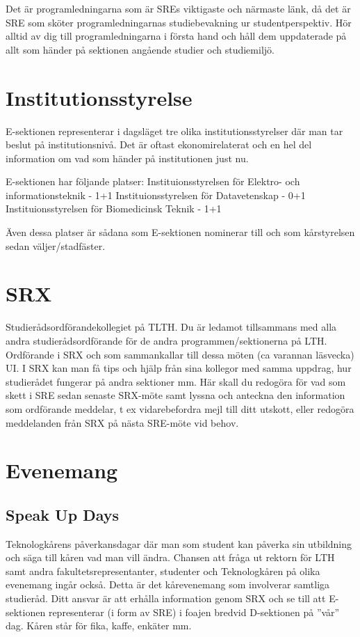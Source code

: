 \documentclass[10pt]{article}
\begin{document}
Det är programledningarna som är SREs viktigaste och närmaste länk, då det är SRE som sköter programledningarnas studiebevakning ur studentperspektiv. Hör alltid av dig till programledningarna i första hand och håll dem uppdaterade på allt som händer på sektionen angående studier och studiemiljö.

\section{Institutionsstyrelse}
E-sektionen representerar i dagsläget tre olika institutionsstyrelser där man tar beslut på institutionsnivå. Det är oftast ekonomirelaterat och en hel del information om vad som händer på institutionen just nu. 

E-sektionen har följande platser:
Instituionsstyrelsen för Elektro- och informationsteknik - 1+1
Instituionsstyrelsen för Datavetenskap - 0+1
Instituionsstyrelsen för Biomedicinsk Teknik - 1+1

Även dessa platser är sådana som E-sektionen nominerar till och som kårstyrelsen sedan väljer/stadfäster.

\section{SRX}
Studierådsordförandekollegiet på TLTH. Du är ledamot tillsammans med alla andra
studierådsordförande för de andra programmen/sektionerna på LTH. Ordförande i SRX
och som sammankallar till dessa möten (ca varannan läsvecka) UI. I SRX kan man få tips och hjälp
från sina kollegor med samma uppdrag, hur studierådet fungerar på andra sektioner
mm. Här skall du redogöra för vad som skett i SRE sedan senaste SRX-möte samt lyssna
och anteckna den information som ordförande meddelar, t ex vidarebefordra mejl till
ditt utskott, eller redogöra meddelanden från SRX på nästa SRE-möte vid behov.

\section{Evenemang}
\subsection{Speak Up Days}
Teknologkårens påverkansdagar där man som student kan påverka sin utbildning och
säga till kåren vad man vill ändra. Chansen att fråga ut rektorn för LTH samt andra
fakultetsrepresentanter, studenter och Teknologkåren på olika evenemang ingår också.
Detta är det kårevenemang som involverar samtliga studieråd. Ditt ansvar är att erhålla
information genom SRX och se till att E-sektionen representerar (i form av SRE) i foajen
bredvid D-sektionen på ”vår” dag. Kåren står för fika, kaffe, enkäter mm.
\end{document}
